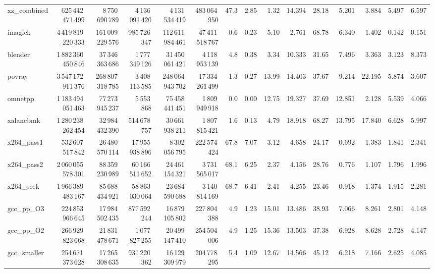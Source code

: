 \documentclass[9pt,landscape,a4paper]{article}
\begin{document}
\begin{adjustbox}{max width=\textwidth, max totalheight=0.50\textheight}
\begin{tabular}{lrrrrrrrrrrrrrr}
xz\_combined & 625\,442\,471\,499 & 8\,750\,690\,789 & 4\,136\,091\,420 & 4\,131\,534\,419 & 483\,064\,950 & 47.3 & 2.85 & 1.32 & 14.394 & 28.18 & 5.201 & 3.884 & 5.497 & 6.597 \\
imagick & 4\,419\,819\,220\,333 & 161\,009\,229\,576 & 985\,726\,347 & 112\,611\,984\,461 & 47\,411\,518\,767 & 0.6 & 0.23 & 5.10 & 2.761 & 68.78 & 6.340 & 1.402 & 0.142 & 0.151 \\
blender & 1\,882\,360\,450\,846 & 37\,346\,363\,686 & 1\,777\,349\,126 & 31\,450\,061\,421 & 4\,118\,953\,139 & 4.8 & 0.38 & 3.34 & 10.333 & 31.65 & 7.496 & 3.363 & 3.123 & 8.373 \\
povray & 3\,547\,172\,911\,376 & 268\,807\,318\,785 & 3\,408\,113\,585 & 248\,064\,943\,702 & 17\,334\,261\,499 & 1.3 & 0.27 & 13.99 & 14.403 & 37.67 & 9.214 & 22.195 & 5.874 & 3.607 \\
omnetpp & 1\,183\,494\,051\,463 & 77\,273\,945\,237 & 5\,553\,868 & 75\,458\,441\,451 & 1\,809\,949\,918 & 0.0 & 0.00 & 12.75 & 19.327 & 37.69 & 12.851 & 2.128 & 5.539 & 4.066 \\
xalancbmk & 1\,280\,238\,262\,454 & 32\,984\,432\,390 & 514\,678\,757 & 30\,661\,938\,211 & 1\,807\,815\,421 & 1.6 & 0.13 & 4.79 & 18.918 & 68.27 & 13.795 & 17.840 & 6.628 & 5.997 \\
x264\_pass1 & 532\,607\,517\,842 & 26\,480\,570\,114 & 17\,955\,938\,896 & 8\,302\,056\,795 & 222\,574\,424 & 67.8 & 7.07 & 3.12 & 4.658 & 24.17 & 0.692 & 1.383 & 1.841 & 2.341 \\
x264\_pass2 & 2\,060\,055\,578\,301 & 88\,359\,230\,989 & 60\,166\,511\,652 & 24\,461\,154\,321 & 3\,731\,565\,017 & 68.1 & 6.25 & 2.37 & 4.156 & 28.76 & 0.776 & 1.107 & 1.796 & 1.996 \\
x264\_seek & 1\,966\,389\,483\,167 & 85\,688\,434\,921 & 58\,863\,030\,064 & 23\,684\,590\,688 & 3\,140\,814\,169 & 68.7 & 6.41 & 2.41 & 4.255 & 23.46 & 0.918 & 1.374 & 1.915 & 2.281 \\
gcc\_pp\_O3 & 224\,853\,966\,645 & 17\,984\,502\,435 & 877\,592\,244 & 16\,879\,105\,802 & 227\,804\,388 & 4.9 & 1.23 & 15.01 & 13.486 & 38.93 & 7.066 & 8.261 & 2.801 & 4.148 \\
gcc\_pp\_O2 & 266\,929\,823\,668 & 21\,831\,478\,671 & 1\,077\,827\,255 & 20\,499\,147\,410 & 254\,504\,006 & 4.9 & 1.25 & 15.36 & 13.503 & 37.38 & 6.928 & 8.628 & 2.728 & 4.147 \\
gcc\_smaller & 254\,671\,373\,628 & 17\,265\,308\,635 & 931\,220\,362 & 16\,129\,309\,979 & 204\,778\,295 & 5.4 & 1.09 & 12.67 & 14.566 & 45.12 & 6.218 & 7.166 & 2.625 & 4.085 \\

\end{tabular}
\end{adjustbox}
\end{document}
